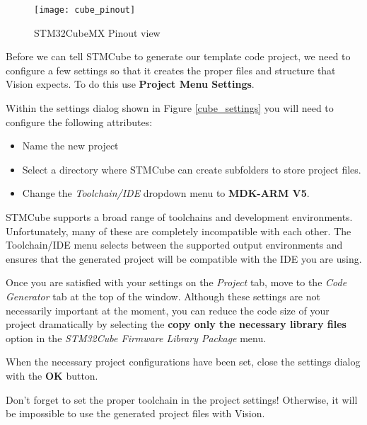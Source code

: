 \documentclass[11pt,fleqn]{book} %
\begin{document}
\begin{figure}[h!]
	\centering\texttt{[image: cube\_pinout]}
	\caption{STM32CubeMX Pinout view}
	\label{cube_pinout}
\end{figure}

Before we can tell STMCube to generate our template code project, we need to configure a few settings so that it creates the proper files and structure that {\textmu}Vision expects. To do this use \textbf{Project Menu \textrightarrow Settings}. 

Within the settings dialog shown in Figure \vref{cube_settings} you will need to configure the following attributes:
\begin{itemize}
	\item Name the new project
	\item Select a directory where STMCube can create subfolders to store project files.
	\item Change the \textit{Toolchain/IDE} dropdown menu to \textbf{MDK-ARM V5}.
\end{itemize}

STMCube supports a broad range of toolchains and development environments. Unfortunately, many of these are completely incompatible with each other. The Toolchain/IDE menu selects between the supported output environments and ensures that the generated project will be compatible with the IDE you are using. 

Once you are satisfied with your settings on the \textit{Project} tab, move to the \textit{Code Generator} tab at the top of the window. Although these settings are not necessarily important at the moment, you can reduce the code size of your project dramatically by selecting the \textbf{copy only the necessary library files} option in the \textit{STM32Cube Firmware Library Package} menu.
 
When the necessary project configurations have been set, close the settings dialog with the \textbf{OK} button. 

\begin{warning}
	Don't forget to set the proper toolchain in the project settings! Otherwise, it will be impossible to use the generated project files with {\textmu}Vision.
\end{warning}
\end{document}
